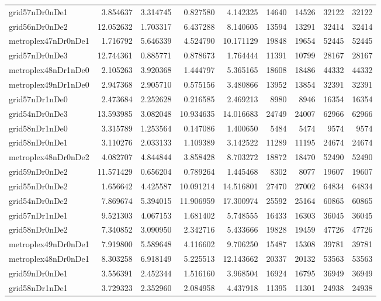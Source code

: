 \begin{longtable}{|l|r|r|r|r|r|r|r|r|}
grid57nDr0nDe1 & 3.854637 & 3.314745 & 0.827580 & 4.142325 & 14640 & 14526 & 32122 & 32122 \\
grid56nDr0nDe2 & 12.052632 & 1.703317 & 6.437288 & 8.140605 & 13594 & 13291 & 32414 & 32414 \\
metroplex47nDr0nDe1 & 1.716792 & 5.646339 & 4.524790 & 10.171129 & 19848 & 19654 & 52445 & 52445 \\
grid57nDr0nDe3 & 12.744361 & 0.885771 & 0.878673 & 1.764444 & 11391 & 10799 & 28167 & 28167 \\
metroplex48nDr1nDe0 & 2.105263 & 3.920368 & 1.444797 & 5.365165 & 18608 & 18486 & 44332 & 44332 \\
metroplex49nDr1nDe0 & 2.947368 & 2.905710 & 0.575156 & 3.480866 & 13952 & 13854 & 32391 & 32391 \\
grid57nDr1nDe0 & 2.473684 & 2.252628 & 0.216585 & 2.469213 & 8980 & 8946 & 16354 & 16354 \\
grid54nDr0nDe3 & 13.593985 & 3.082048 & 10.934635 & 14.016683 & 24749 & 24007 & 62966 & 62966 \\
grid58nDr1nDe0 & 3.315789 & 1.253564 & 0.147086 & 1.400650 & 5484 & 5474 & 9574 & 9574 \\
grid58nDr0nDe1 & 3.110276 & 2.033133 & 1.109389 & 3.142522 & 11289 & 11195 & 24674 & 24674 \\
metroplex48nDr0nDe2 & 4.082707 & 4.844844 & 3.858428 & 8.703272 & 18872 & 18470 & 52490 & 52490 \\
grid59nDr0nDe2 & 11.571429 & 0.656204 & 0.789264 & 1.445468 & 8302 & 8077 & 19607 & 19607 \\
grid55nDr0nDe2 & 1.656642 & 4.425587 & 10.091214 & 14.516801 & 27470 & 27002 & 64834 & 64834 \\
grid54nDr0nDe2 & 7.869674 & 5.394015 & 11.906959 & 17.300974 & 25592 & 25164 & 60865 & 60865 \\
grid57nDr1nDe1 & 9.521303 & 4.067153 & 1.681402 & 5.748555 & 16433 & 16303 & 36045 & 36045 \\
grid58nDr0nDe2 & 7.340852 & 3.090950 & 2.342716 & 5.433666 & 19828 & 19459 & 47726 & 47726 \\
metroplex49nDr0nDe1 & 7.919800 & 5.589648 & 4.116602 & 9.706250 & 15487 & 15308 & 39781 & 39781 \\
metroplex48nDr0nDe1 & 8.303258 & 6.918149 & 5.225513 & 12.143662 & 20337 & 20132 & 53563 & 53563 \\
grid59nDr0nDe1 & 3.556391 & 2.452344 & 1.516160 & 3.968504 & 16924 & 16795 & 36949 & 36949 \\
grid58nDr1nDe1 & 3.729323 & 2.352960 & 2.084958 & 4.437918 & 11395 & 11301 & 24938 & 24938 \\

\end{longtable}
